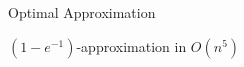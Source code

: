 \begin{frame}{Optimal Approximation}
    \begin{center}
        $(1 - e^{-1})$-approximation in $O(n^5)$
    \end{center}
\end{frame}